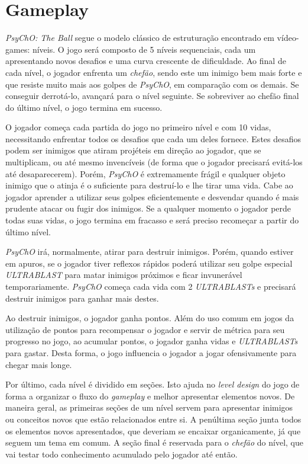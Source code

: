 \section{Gameplay}
\label{sec:gameplay}

\textit{PsyChO: The Ball} segue o modelo clássico de estruturação encontrado em vídeo-games: níveis. O jogo será composto de 5 níveis sequenciais, cada um apresentando novos desafios e uma curva crescente de dificuldade. Ao final de cada nível, o jogador enfrenta um \textit{chefão}, sendo este um inimigo bem mais forte e que resiste muito mais aos golpes de \textit{PsyChO}, em comparação com os demais. Se conseguir derrotá-lo, avançará para o nível seguinte. Se sobreviver ao chefão final do último nível, o jogo termina em sucesso.

O jogador começa cada partida do jogo no primeiro nível e com 10 vidas, necessitando enfrentar todos os desafios que cada um deles fornece. Estes desafios podem ser inimigos que atiram projéteis em direção ao jogador, que se multiplicam, ou até mesmo invencíveis (de forma que o jogador precisará evitá-los até desaparecerem). Porém, \textit{PsyChO} é extremamente frágil e qualquer objeto inimigo que o atinja é o suficiente para destruí-lo e lhe tirar uma vida. Cabe ao jogador aprender a utilizar seus golpes eficientemente e desvendar quando é mais prudente atacar ou fugir dos inimigos. Se a qualquer momento o jogador perde todas suas vidas, o jogo termina em fracasso e será preciso recomeçar a partir do último nível.

\textit{PsyChO} irá, normalmente, atirar para destruir inimigos. Porém, quando estiver em apuros, se o jogador tiver reflexos rápidos poderá utilizar seu golpe especial \textit{ULTRABLAST} para matar inimigos próximos e ficar invunerável temporariamente. \textit{PsyChO} começa cada vida com 2 \textit{ULTRABLASTs} e precisará destruir inimigos para ganhar mais destes.

Ao destruir inimigos, o jogador ganha pontos. Além do uso comum em jogos da utilização de pontos para recompensar o jogador e servir de métrica para seu progresso no jogo, ao acumular pontos, o jogador ganha vidas e \textit{ULTRABLASTs} para gastar. Desta forma, o jogo influencia o jogador a jogar ofensivamente para chegar mais longe.

Por último, cada nível é dividido em seções. Isto ajuda no \textit{level design} do jogo de forma a organizar o fluxo do \textit{gameplay} e melhor apresentar elementos novos. De maneira geral, as primeiras seções de um nível servem para apresentar inimigos ou conceitos novos que estão relacionados entre si. A penúltima seção junta todos os elementos novos apresentados, que deveriam se encaixar organicamente, já que seguem um tema em comum. A seção final é reservada para o \textit{chefão} do nível, que vai testar todo conhecimento acumulado pelo jogador até então.

